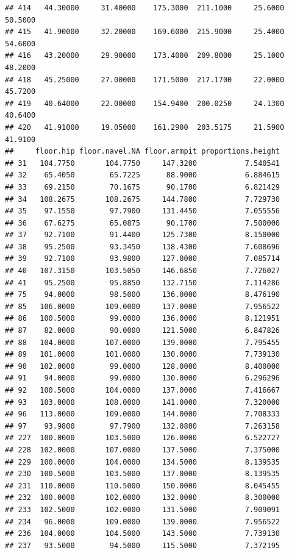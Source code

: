 \documentclass[]{article}
\begin{document}
\begin{verbatim}
## 414   44.30000     31.40000    175.3000  211.1000     25.6000       50.5000
## 415   41.90000     32.20000    169.6000  215.9000     25.4000       54.6000
## 416   43.20000     29.90000    173.4000  209.8000     25.1000       48.2000
## 418   45.25000     27.00000    171.5000  217.1700     22.0000       45.7200
## 419   40.64000     22.00000    154.9400  200.0250     24.1300       40.6400
## 420   41.91000     19.05000    161.2900  203.5175     21.5900       41.9100
##     floor.hip floor.navel.NA floor.armpit proportions.height
## 31   104.7750       104.7750     147.3200           7.540541
## 32    65.4050        65.7225      88.9000           6.884615
## 33    69.2150        70.1675      90.1700           6.821429
## 34   108.2675       108.2675     144.7800           7.729730
## 35    97.1550        97.7900     131.4450           7.055556
## 36    67.6275        65.0875      90.1700           7.500000
## 37    92.7100        91.4400     125.7300           8.150000
## 38    95.2500        93.3450     138.4300           7.608696
## 39    92.7100        93.9800     127.0000           7.085714
## 40   107.3150       103.5050     146.6850           7.726027
## 41    95.2500        95.8850     132.7150           7.114286
## 75    94.0000        98.5000     136.0000           8.476190
## 85   106.0000       109.0000     137.0000           7.956522
## 86   100.5000        99.0000     136.0000           8.121951
## 87    82.0000        90.0000     121.5000           6.847826
## 88   104.0000       107.0000     139.0000           7.795455
## 89   101.0000       101.0000     130.0000           7.739130
## 90   102.0000        99.0000     128.0000           8.400000
## 91    94.0000        99.0000     130.0000           6.296296
## 92   100.5000       104.0000     137.0000           7.416667
## 93   103.0000       108.0000     141.0000           7.320000
## 96   113.0000       109.0000     144.0000           7.708333
## 97    93.9800        97.7900     132.0800           7.263158
## 227  100.0000       103.5000     126.0000           6.522727
## 228  102.0000       107.0000     137.5000           7.375000
## 229  100.0000       104.0000     134.5000           8.139535
## 230  100.5000       103.5000     137.0000           8.139535
## 231  110.0000       110.5000     150.0000           8.045455
## 232  100.0000       102.0000     132.0000           8.300000
## 233  102.5000       102.0000     131.5000           7.909091
## 234   96.0000       109.0000     139.0000           7.956522
## 236  104.0000       104.5000     143.5000           7.739130
## 237   93.5000        94.5000     115.5000           7.372195

\end{verbatim}
\end{document}
